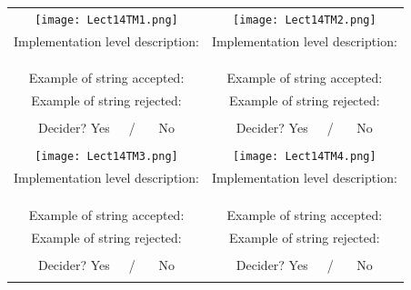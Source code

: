 \documentclass[12pt, oneside]{article}
\begin{document}
  
  \begin{center}
  \begin{tabular}{|c|c|}
  \hline
  \hspace{0.8in}\texttt{[image: Lect14TM1.png]} \phantom{\hspace{0.8in}}&\hspace{0.8in} \texttt{[image: Lect14TM2.png]} \phantom{\hspace{0.8in}}\\
  Implementation  level description:  \phantom{\hspace{1in}} &Implementation  level description:  \phantom{\hspace{1in}} \\
  &\\
  &\\
  &\\
  Example of string accepted: \phantom{\hspace{1.5in}}& Example of string accepted: \phantom{\hspace{1.5in}}\\
  Example of string rejected: \phantom{\hspace{1.5in}}& Example of string  rejected: \phantom{\hspace{1.5in}}\\
  &\\
  Decider? Yes~~~/ ~~~No
  &Decider? Yes~~~/ ~~~No\\
  & \\
  \hline
  \texttt{[image: Lect14TM3.png]} & \texttt{[image: Lect14TM4.png]} \\
  Implementation  level description:  \phantom{\hspace{1in}} &Implementation  level description:  \phantom{\hspace{1in}} \\
  &\\
  &\\
  &\\
  Example of string accepted: \phantom{\hspace{1.5in}}& Example of string accepted: \phantom{\hspace{1.5in}}\\
  Example of string rejected: \phantom{\hspace{1.5in}}& Example of string  rejected: \phantom{\hspace{1.5in}}\\
  &\\
  Decider? Yes~~~/ ~~~No
  &Decider? Yes~~~/ ~~~No\\
  & \\
  
  \hline
  \end{tabular}
  \end{center} \vfill
\end{document}
